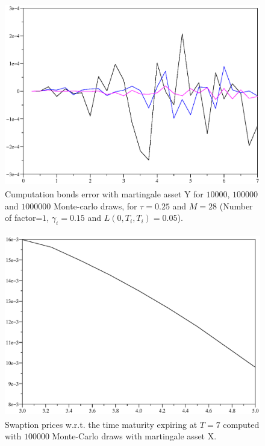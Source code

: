 \begin{figure}[H]
\begin{center}
\includegraphics[height=8cm]{./figures/bondserrorY.eps}
\caption{Cumputation bonds error with martingale asset Y for $10 000$, $100 000$ and $1 000 000$ Monte-carlo
  draws, for $\tau=0.25$ and $M=28$ (Number of factor=$1$, $\gamma_i=0.15$ and $L(0,T_i,T_i)=0.05$).}
\label{bonderrorY}
\end{center}
\end{figure}
\begin{figure}[H]
\begin{center}
\includegraphics[height=8cm]{./figures/swptX.eps}
\caption{Swaption prices w.r.t. the time maturity  expiring at $T=7$
  computed with $100 000$ Monte-Carlo draws  with martingale asset X.} 
\label{swptX}
\end{center}
\end{figure}
